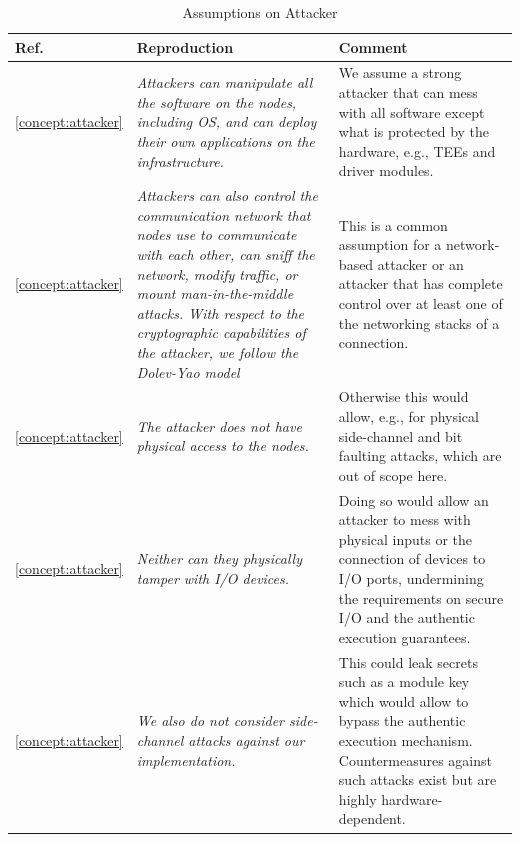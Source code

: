 \clearpage

\begin{longtable}{|p{}|p{}|p{}|}
\caption{Assumptions on Attacker}\\
\hline
Ref. & Reproduction & Comment \\
\hline
\hline

\ref{concept:attacker} & 
\em Attackers can manipulate all the software on the nodes, including OS, and can deploy their own applications on the infrastructure. & 
We assume a strong attacker that can mess with all software except what is protected by the hardware, e.g., TEEs and driver modules. \\
\hline

\ref{concept:attacker} & 
\em Attackers can also control the communication network that nodes use to communicate with each other, can sniff the network, modify traffic, or mount man-in-the-middle attacks. With respect to the cryptographic capabilities of the attacker, we follow the Dolev-Yao model &
This is a common assumption for a network-based attacker or an attacker that has complete control over at least one of the networking stacks of a connection. \\
\hline

\ref{concept:attacker} & 
\em The attacker does not have physical access to the nodes. &
Otherwise this would allow, e.g., for physical side-channel and bit faulting attacks, which are out of scope here. \\
\hline

\ref{concept:attacker} & 
\em Neither can they physically tamper with I/O devices. &
Doing so would allow an attacker to mess with physical inputs or the connection of devices to I/O ports, undermining the requirements on secure I/O and the authentic execution guarantees. \\
\hline

\ref{concept:attacker} & 
\em We also do not consider side-channel attacks against our implementation. &
This could leak secrets such as a module key which would allow to bypass the authentic execution mechanism. Countermeasures against such attacks exist but are highly hardware-dependent.\\
\hline

\end{longtable}

\clearpage

